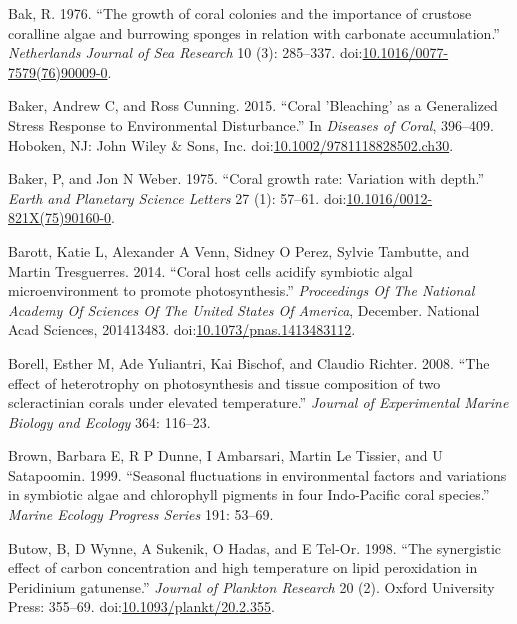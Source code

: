 \documentclass[]{elsarticle} %
\begin{document}
\hypertarget{ref-Bak:1976bv}{}
Bak, R. 1976. ``The growth of coral colonies and the importance of
crustose coralline algae and burrowing sponges in relation with
carbonate accumulation.'' \emph{Netherlands Journal of Sea Research} 10
(3): 285--337.
doi:\href{https://doi.org/10.1016/0077-7579(76)90009-0}{10.1016/0077-7579(76)90009-0}.

\hypertarget{ref-Baker:2015kp}{}
Baker, Andrew C, and Ross Cunning. 2015. ``Coral 'Bleaching' as a
Generalized Stress Response to Environmental Disturbance.'' In
\emph{Diseases of Coral}, 396--409. Hoboken, NJ: John Wiley \& Sons,
Inc.
doi:\href{https://doi.org/10.1002/9781118828502.ch30}{10.1002/9781118828502.ch30}.

\hypertarget{ref-Baker:1975ip}{}
Baker, P, and Jon N Weber. 1975. ``Coral growth rate: Variation with
depth.'' \emph{Earth and Planetary Science Letters} 27 (1): 57--61.
doi:\href{https://doi.org/10.1016/0012-821X(75)90160-0}{10.1016/0012-821X(75)90160-0}.

\hypertarget{ref-Barott:2014gx}{}
Barott, Katie L, Alexander A Venn, Sidney O Perez, Sylvie Tambutte, and
Martin Tresguerres. 2014. ``Coral host cells acidify symbiotic algal
microenvironment to promote photosynthesis.'' \emph{Proceedings Of The
National Academy Of Sciences Of The United States Of America}, December.
National Acad Sciences, 201413483.
doi:\href{https://doi.org/10.1073/pnas.1413483112}{10.1073/pnas.1413483112}.

\hypertarget{ref-Borell:2008p108}{}
Borell, Esther M, Ade Yuliantri, Kai Bischof, and Claudio Richter. 2008.
``The effect of heterotrophy on photosynthesis and tissue composition of
two scleractinian corals under elevated temperature.'' \emph{Journal of
Experimental Marine Biology and Ecology} 364: 116--23.

\hypertarget{ref-Brown:1999p3534}{}
Brown, Barbara E, R P Dunne, I Ambarsari, Martin Le Tissier, and U
Satapoomin. 1999. ``Seasonal fluctuations in environmental factors and
variations in symbiotic algae and chlorophyll pigments in four
Indo-Pacific coral species.'' \emph{Marine Ecology Progress Series} 191:
53--69.

\hypertarget{ref-Butow:1998gz}{}
Butow, B, D Wynne, A Sukenik, O Hadas, and E Tel-Or. 1998. ``The
synergistic effect of carbon concentration and high temperature on lipid
peroxidation in Peridinium gatunense.'' \emph{Journal of Plankton
Research} 20 (2). Oxford University Press: 355--69.
doi:\href{https://doi.org/10.1093/plankt/20.2.355}{10.1093/plankt/20.2.355}.
\end{document}
